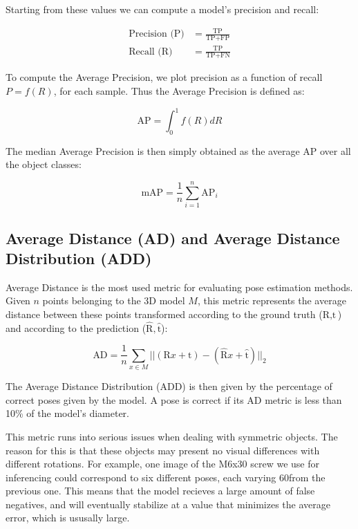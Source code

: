 Starting from these values we can compute a model's precision and recall:

\begin{align*}
    \text{Precision (P)} &= \frac{\text{TP}}{\text{TP} + \text{FP}}\\
    \text{Recall (R)} &= \frac{\text{TP}}{\text{TP} + \text{FN}}
\end{align*}

To compute the Average Precision, we plot precision as a function of recall $P = f(R)$, for each sample. Thus the Average Precision is defined as:

\begin{equation*}
    \text{AP} = \int_{0}^{1} f(R)dR
\end{equation*}

The median Average Precision is then simply obtained as the average AP over all the object classes:

\begin{equation*}
    \text{mAP} = \frac{1}{n} \sum_{i=1}^{n} \text{AP}_{i}
\end{equation*}

\subsection*{Average Distance (AD) and Average Distance Distribution (ADD)}

Average Distance is the most used metric for evaluating pose estimation methods. Given $n$ points belonging to the 3D model $M$, this metric represents the average distance between these points transformed according to the ground truth ($\text{R}, \text{t}$) and according to the prediction ($\hat{\text{R}}, \hat{\text{t}}$):

\begin{equation*}
    \text{AD} = \frac{1}{n} \sum_{x \in M} ||(\text{R}x + \text{t}) - 
    (\hat{\text{R}}x + \hat{\text{t}})||_2
\end{equation*}

The Average Distance Distribution (ADD) is then given by the percentage of correct poses given by the model. A pose is correct if its AD metric is less than 10\% of the model's diameter.

This metric runs into serious issues when dealing with symmetric objects. The reason for this is that these objects may present no visual differences with different rotations. For example, one image of the M6x30 screw we use for inferencing could correspond to six different poses, each varying 60\degree from the previous one. This means that the model recieves a large amount of false negatives, and will eventually stabilize at a value that minimizes the average error, which is ususally large.

